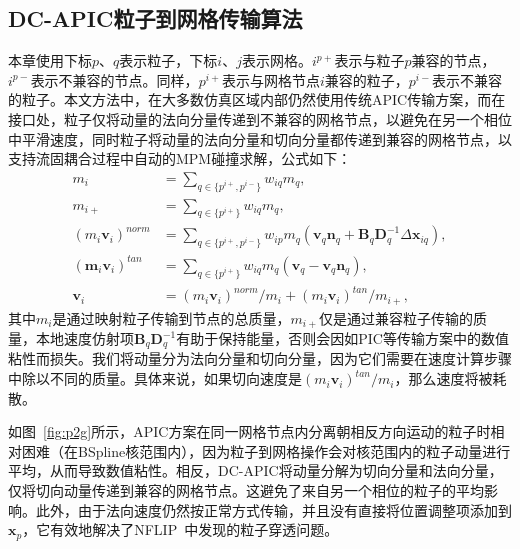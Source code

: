 \subsection{DC-APIC粒子到网格传输算法}
\label{sec:DC-APIC_p2g}
本章使用下标$p$、$q$表示粒子，下标$i$、$j$表示网格。$i^{p+}$表示与粒子$p$兼容的节点，$i^{p-}$表示不兼容的节点。同样，$p^{i+}$表示与网格节点$i$兼容的粒子，$p^{i-}$表示不兼容的粒子。本文方法中，在大多数仿真区域内部仍然使用传统APIC传输方案，而在接口处，粒子仅将动量的法向分量传递到不兼容的网格节点，以避免在另一个相位中平滑速度，同时粒子将动量的法向分量和切向分量都传递到兼容的网格节点，以支持流固耦合过程中自动的MPM碰撞求解，公式如下：
\begin{equation}
\begin{aligned}
    m_i &= \sum_{q\in\{p^{i+},p^{i-}\}}w_{iq}m_q, \\
    m_{i+} &= \sum_{q\in\{p^{i+}\}}w_{iq}m_q, \\
    (m_i\mathbf{v}_i)^{norm} &=\sum_{q\in\{p^{i+},p^{i-}\}}w_{ip}m_q(\mathbf{v}_q\mathbf{n}_q + \mathbf{B}_q\mathbf{D}_q^{-1}\Delta\mathbf{x}_{iq}), \\
    (\mathbf{m}_i\mathbf{v}_i)^{tan} &=\sum_{q\in\{p^{i+}\}}w_{iq}m_q(\mathbf{v}_q - \mathbf{v}_q\mathbf{n}_q), \\
    \mathbf{v}_i &=(m_i\mathbf{v}_i)^{norm}/m_i+(m_i\mathbf{v}_i)^{tan}/m_{i+},
\end{aligned}
\end{equation}
其中$m_i$是通过映射粒子传输到节点的总质量，$m_{i+}$仅是通过兼容粒子传输的质量，本地速度仿射项$\mathbf{B}_q\mathbf{D}_q^{-1}$有助于保持能量，否则会因如PIC等传输方案中的数值粘性而损失。我们将动量分为法向分量和切向分量，因为它们需要在速度计算步骤中除以不同的质量。具体来说，如果切向速度是$(m_i\mathbf{v}_i)^{tan}/m_i$，那么速度将被耗散。

如图~\ref{fig:p2g}所示，APIC方案在同一网格节点内分离朝相反方向运动的粒子时相对困难（在BSpline核范围内），因为粒子到网格操作会对核范围内的粒子动量进行平均，从而导致数值粘性。相反，DC-APIC将动量分解为切向分量和法向分量，仅将切向动量传递到兼容的网格节点。这避免了来自另一个相位的粒子的平均影响。此外，由于法向速度仍然按正常方式传输，并且没有直接将位置调整项添加到$\mathbf{x}_p$，它有效地解决了NFLIP~\cite{stomakhin2013material}中发现的粒子穿透问题。

